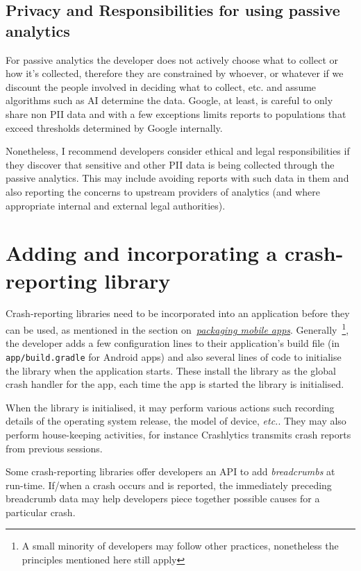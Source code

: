 \subsection{Privacy and Responsibilities for using passive analytics}
For passive analytics the developer does not actively choose what to collect or how it's collected, therefore they are constrained by whoever, or whatever if we discount the people involved in deciding what to collect, etc. and assume algorithms such as AI determine the data. Google, at least, is careful to only share non PII %
data and with a few exceptions limits reports to populations that exceed thresholds determined by Google internally. %

Nonetheless, I recommend developers consider ethical and legal responsibilities if they discover that sensitive and other PII data is being collected through the passive analytics. This may include avoiding reports with such data in them and also reporting the concerns to upstream providers of analytics (and where appropriate internal and external legal authorities).

\section{Adding and incorporating a crash-reporting library}
Crash-reporting libraries need to be incorporated into an application before they can be used, as mentioned in the section on~\href{section-packaging-mobile-apps}{\emph{packaging mobile apps}}. Generally~\footnote{A small minority of developers may follow other practices, nonetheless the principles mentioned here still apply}, the developer adds a few configuration lines to their application's build file (in \texttt{app/build.gradle} for Android apps) and also several lines of code to initialise the library when the application starts. These install the library as the global crash handler for the app, each time the app is started the library is initialised. 

When the library is initialised, it may perform various actions such recording details of the operating system release, the model of device, \emph{etc.}. They may also perform house-keeping activities, for instance Crashlytics transmits crash reports from previous sessions.

Some crash-reporting libraries offer developers an API to add \emph{breadcrumbs} at run-time. If/when a crash occurs and is reported, the immediately preceding breadcrumb data may help developers piece together possible causes for a particular crash.

